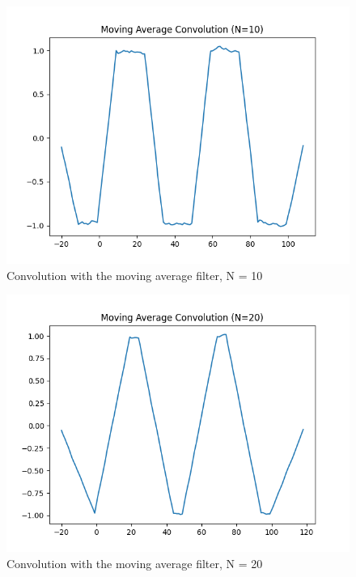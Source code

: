 \documentclass[10pt,a4paper, margin=1in]{article}
\begin{document}
\begin{enumerate}
\begin{enumerate}
\begin{figure}[H]
\end{figure}
\begin{figure}[H]
    \centering
    \caption{Convolution with the moving average filter, N = 10}
    \includegraphics[width=0.4\linewidth]{images/moving_average_10.png}
\end{figure}
\begin{figure}[H]
    \centering
    \caption{Convolution with the moving average filter, N = 20}
    \includegraphics[width=0.4\linewidth]{images/moving_average_20.png}
\end{figure}

    \end{enumerate}

\end{enumerate}
\end{document}
